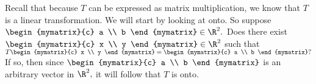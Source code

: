 \begin{solution} Recall that because $T$ can be expressed as matrix
multiplication, we know that $T$ is a linear transformation.  We will
start by looking at onto.  So suppose $\begin{mymatrix}{c}
a \\
b
\end{mymatrix} \in \R^{2}.$ Does there exist $\begin{mymatrix}{c}
x \\
y
\end{mymatrix}  \in \R^2 $ such that $T\begin{mymatrix}{c}
x \\
y
\end{mymatrix} =\begin{mymatrix}{c}
a \\
b
\end{mymatrix} ?$ If so, then since $\begin{mymatrix}{c}
a \\
b
\end{mymatrix} $ is an arbitrary vector in $\R^{2},$ it will follow that $T$
is onto. 


\end{solution}
